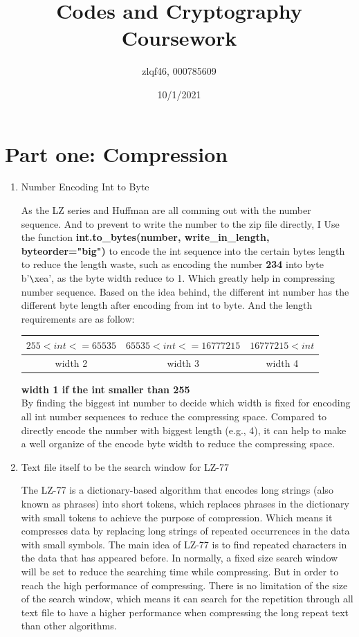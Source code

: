 \documentclass[margin 2cm]{report}
\title{\textbf{Codes and Cryptography Coursework}}
\author{zlqf46, 000785609}
\date{10/1/2021}
\begin{document}
\maketitle
\section[1]{\Large Part one: Compression}
\begin{enumerate}
\normalsize\item[1)]{Number Encoding Int to Byte}
\begin{spacing}{1.5}
\normalsize\indent\setlength{\parindent}{2em}As the LZ series and Huffman are all comming out with the number sequence. And to prevent to write the number to the zip file directly, I Use the function \textbf{int.to\_bytes(number, write\_in\_length, byteorder="big")} to encode the int sequence into the certain bytes length to reduce the length waste, such as encoding the number \textbf{234} into byte b'\verb|\|xea', as the byte width reduce to 1. Which greatly help in compressing number sequence.
\newline Based on the idea behind, the different int number has the different byte length after encoding from int to byte. And the length requirements are as follow:
\newline
\newline
\begin{tabular}{|c|c|c|}
\hline
$255<int<=65535$&$65535<int<=16777215$&$16777215<int$\\
\hline
width 2&width 3&width 4\\
\hline
\end{tabular}
\newline\normalsize\textbf{width 1 if the int smaller than 255}\\
By finding the biggest int number to decide which width is fixed for encoding all int number sequences to reduce the compressing space. Compared to directly encode the number with biggest length (e.g., 4), it can help to make a well organize of the encode byte width to reduce the compressing space.
\end{spacing}

\normalsize\item[2)]{Text file itself to be the search window for LZ-77}
\begin{spacing}{1.5}
\normalsize\indent\setlength{\parindent}{2em}The LZ-77 is a dictionary-based algorithm that encodes long strings (also known as phrases) into short tokens, which replaces phrases in the dictionary with small tokens to achieve the purpose of compression. Which means it compresses data by replacing long strings of repeated occurrences in the data with small symbols. The main idea of LZ-77 is to find repeated characters in the data that has appeared before. In normally, a fixed size search window will be set to reduce the searching time while compressing. But in order to reach the high performance of compressing. There is no limitation of the size of the search window, which means it can search for the repetition through all text file to have a higher performance when compressing the long repeat text than other algorithms.
\end{spacing}


\end{enumerate}
\end{document}
